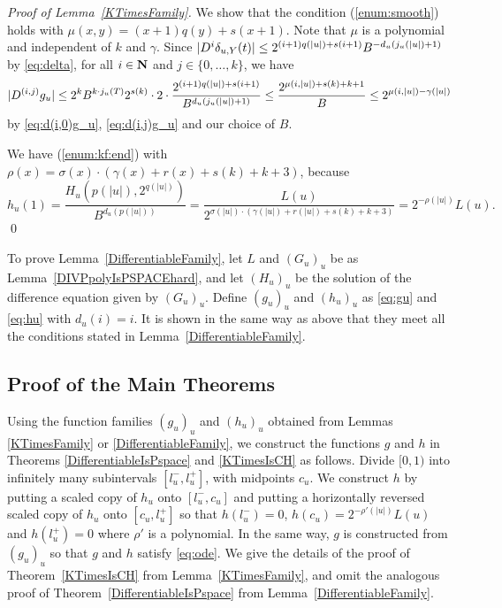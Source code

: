 \begin{proof}[Proof of Lemma~\ref{KTimesFamily}]
We show that the condition (\ref{enum:smooth}) holds with $\mu(x, y) = (x+1)q(y) + s(x+1)$.
Note that $\mu$ is a polynomial and independent of $k$ and $\gamma$.
Since $|D^i \delta_{u,Y}(t)| \le 2^{(i+1)q(|u|) + s(i+1)}B^{-d_u(j_u(|u|)+1)}$ by \eqref{eq:delta}, for all $i \in \mathbf N$ and $j \in \{0, \dots, k\}$, we have
 \begin{equation}
  |D^{(i,j)} g_u| 
   \le 
   2^k B^{k \cdot j_u(T)} 2^{s(k)} \cdot 2 \cdot 
   \frac{2^{(i+1)q(|u|) + s(i+1)}}{B^{d_u(j_u(|u|)+1)}} 
   \le
   \frac{2^{\mu(i, |u|) + s(k) + k + 1}}{B}
   \le
   2^{\mu(i, |u|) - \gamma(|u|)}
 \end{equation}
by \eqref{eq:d(i,0)g_u}, \eqref{eq:d(i,j)g_u} and our choice of $B$.

We have (\ref{enum:kf:end}) with
  $\rho(x) = \sigma(x) \cdot (\gamma(x)+r(x)+s(k)+k+3)$, because
  \begin{equation}
   h_u(1) = \frac{H_u(p(|u|), 2^{q(|u|)})}{B^{d_u(p(|u|))}} 
          = \frac{L(u)}{2^{\sigma(|u|) \cdot (\gamma(|u|)+r(|u|)+s(k)+k+3)}}
	  = 2^{-\rho(|u|)} L(u).
  \end{equation}
\qed
\end{proof}



 To prove Lemma~\ref{DifferentiableFamily}, 
 let $L$ and $(G_u)_u$ be as Lemma~\ref{DIVPpolyIsPSPACEhard},
 and let $(H_u)_u$ be the solution of the difference equation given by $(G_u)_u$.
 Define $(g_u)_u$ and $(h_u)_u$ as \eqref{eq:gu} and \eqref{eq:hu}
 with $d_u(i) = i$.
 It is shown in the same way as above that they meet all the conditions
 stated in Lemma~\ref{DifferentiableFamily}.


\subsection{Proof of the Main Theorems}
\label{subsection: proof of theorems}
Using the function families $(g_u)_u$ and $(h_u)_u$ 
obtained from Lemmas \ref{KTimesFamily} or \ref{DifferentiableFamily}, 
we construct the functions $g$ and $h$ in 
Theorems \ref{DifferentiableIsPspace} and \ref{KTimesIsCH} as follows. 
Divide $[0,1)$ into infinitely many subintervals $[l^-_u, l^+_u]$,
with midpoints $c_u$.
We construct $h$ by putting a scaled copy of $h_u$ onto $[l^-_u, c_u]$ and
putting a horizontally reversed scaled copy of $h_u$ onto $[c_u, l^+_u]$ 
so that $h(l^-_u) = 0$, $h(c_u) = 2^{-\rho'(|u|)} L(u)$ and $h(l^+_u) = 0$ where $\rho'$ is a polynomial.
In the same way, $g$ is constructed from $(g_u)_u$ so that $g$ and $h$ satisfy \eqref{eq:ode}.
We give the details of the proof of 
Theorem~\ref{KTimesIsCH} from Lemma~\ref{KTimesFamily}, 
and omit the analogous proof of Theorem~\ref{DifferentiableIsPspace} 
from Lemma~\ref{DifferentiableFamily}. 


